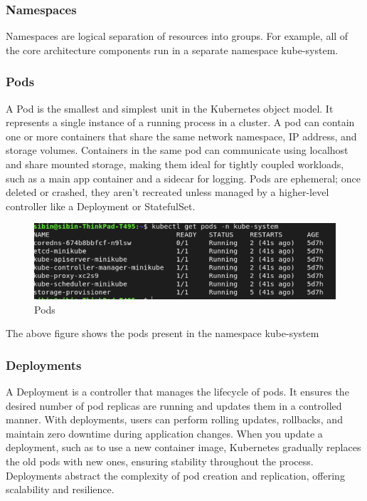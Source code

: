 \subsubsection{Namespaces}
Namespaces are logical separation of resources into groups. For example, all of the core architecture components run in a separate namespace kube-system.

\subsubsection{Pods}
A Pod is the smallest and simplest unit in the Kubernetes object model. It represents a single instance of a running process in a cluster. A pod can contain one or more containers that share the same network namespace, IP address, and storage volumes. Containers in the same pod can communicate using localhost and share mounted storage, making them ideal for tightly coupled workloads, such as a main app container and a sidecar for logging. Pods are ephemeral; once deleted or crashed, they aren't recreated unless managed by a higher-level controller like a Deployment or StatefulSet.


\begin{figure}[H]
\caption{Pods}
\centering
\includegraphics[width=1\textwidth]{SOA/k8s-components.png}
\end{figure}

The above figure shows the pods present in the namespace kube-system

\subsubsection{Deployments}
A Deployment is a controller that manages the lifecycle of pods. It ensures the desired number of pod replicas are running and updates them in a controlled manner. With deployments, users can perform rolling updates, rollbacks, and maintain zero downtime during application changes. When you update a deployment, such as to use a new container image, Kubernetes gradually replaces the old pods with new ones, ensuring stability throughout the process. Deployments abstract the complexity of pod creation and replication, offering scalability and resilience.

